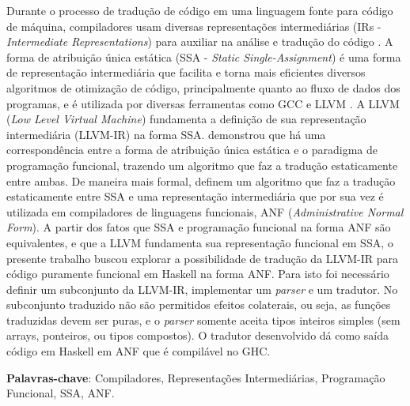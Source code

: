 
\setlength{\absparsep}{18pt} %
\begin{resumo}
    Durante o processo de tradução de código em uma linguagem fonte para código de máquina, compiladores usam diversas representações intermediárias (IRs - \emph{Intermediate Representations}) para auxiliar na análise e tradução do código \cite{dragao}. A forma de atribuição única estática (SSA - \emph{Static Single-Assignment}) é uma forma de representação intermediária que facilita e torna mais eficientes diversos algoritmos de otimização de código, principalmente quanto ao fluxo de dados dos programas, e é utilizada por diversas ferramentas como GCC e LLVM \cite{muchnick1997advanced}. A LLVM (\emph{Low Level Virtual Machine}) fundamenta a definição de sua representação intermediária (LLVM-IR) na forma SSA.  demonstrou que há uma correspondência entre a forma de atribuição única estática e o paradigma de programação funcional, trazendo um algoritmo que faz a tradução estaticamente entre ambas. De maneira mais formal,  definem um algoritmo que faz a tradução estaticamente entre SSA e uma representação intermediária que por sua vez é utilizada em compiladores de linguagens funcionais, ANF (\emph{Administrative Normal Form}). A partir dos fatos que SSA e programação funcional na forma ANF são equivalentes, e que a LLVM fundamenta sua representação funcional em SSA, o presente trabalho buscou explorar a possibilidade de tradução da LLVM-IR para código puramente funcional em Haskell na forma ANF. Para isto foi necessário definir um subconjunto da LLVM-IR, implementar um \emph{parser} e um tradutor. No subconjunto traduzido não são permitidos efeitos colaterais, ou seja, as funções traduzidas devem ser puras, e o \emph{parser} somente aceita tipos inteiros simples (sem arrays, ponteiros, ou tipos compostos). O tradutor desenvolvido dá como saída código em Haskell em ANF que é compilável no GHC.

 \textbf{Palavras-chave}: Compiladores, Representações Intermediárias, Programação Funcional, SSA, ANF.
\end{resumo}
